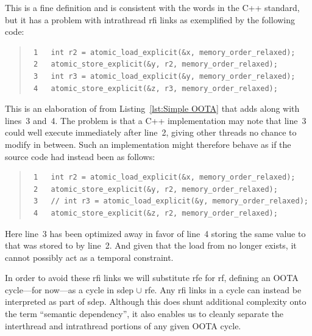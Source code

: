 \documentclass[10]{article}
\begin{document}
This is a fine definition and is consistent with the words in the C++
standard, but it has a problem with intrathread rfi links
as exemplified by the following code:
\begin{quote}
\scriptsize
\begin{verbatim}
 1   int r2 = atomic_load_explicit(&x, memory_order_relaxed);
 2   atomic_store_explicit(&y, r2, memory_order_relaxed);
 3   int r3 = atomic_load_explicit(&y, memory_order_relaxed);
 4   atomic_store_explicit(&z, r3, memory_order_relaxed);
\end{verbatim}
\end{quote}
This is an elaboration of  from
Listing~\ref{lst:Simple OOTA}
that adds  along with lines~3 and~4.
The problem is that a C++ implementation may
note that line~3 could well execute immediately after line~2, giving
other threads no chance to modify  in between.
Such an implementation might therefore behave as if the source code
had instead been as follows:
\begin{quote}
\scriptsize
\begin{verbatim}
 1   int r2 = atomic_load_explicit(&x, memory_order_relaxed);
 2   atomic_store_explicit(&y, r2, memory_order_relaxed);
 3   // int r3 = atomic_load_explicit(&y, memory_order_relaxed);
 4   atomic_store_explicit(&z, r2, memory_order_relaxed);
\end{verbatim}
\end{quote}
Here line~3 has been optimized away in favor of line~4 storing the same value
to  that was stored to  by line~2.
And given that the load from  no longer exists, it cannot possibly
act as a temporal constraint.

In order to avoid these rfi links we will substitute rfe
for rf, defining an OOTA cycle---for now---as a cycle in sdep $\cup$ rfe.
Any rfi links in a cycle can instead be interpreted as part of sdep.
Although this does shunt additional complexity onto the term
``semantic dependency'', it also enables us to cleanly separate
the interthread and intrathread portions of any given OOTA cycle.

\end{document}
